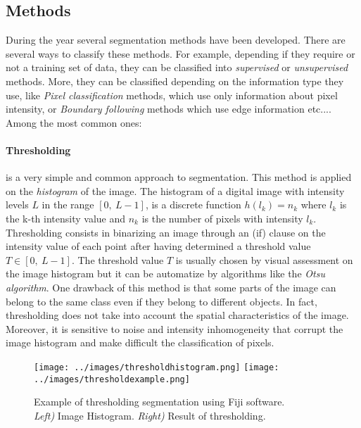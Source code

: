 \documentclass{standalone}
\begin{document}
\subsection{Methods}
During the year several segmentation methods have been developed\cite{biondi}.
There are several ways to classify these methods.
For example, depending if they require or not a training set of data, they can be classified into \textit{supervised} or \textit{unsupervised} methods.
More, they can be classified depending on the information type they use, like \textit{Pixel classification} methods, which use only information about pixel intensity, or \textit{Boundary following} methods which use edge information etc...\cite{biondi}.\\
Among the most common ones:

\paragraph{Thresholding}
is a very simple and common approach to segmentation.
This method is applied on the \textit{histogram} of the image.
The histogram of a digital image with intensity levels $L$ in the range $[0, \: L-1]$, is a discrete function $h(l_k) = n_k$ where $l_k$ is the k-th intensity value and $n_k$  is the number of pixels with intensity $l_k$.\\
Thresholding consists in binarizing an image through an (if) clause on the intensity value of each point after having determined a threshold value $T \in [0, \: L-1]$.
The threshold value $T$ is usually chosen by visual assessment on the image histogram but it can be automatize by algorithms like the \textit{Otsu algorithm}.
One drawback of this method is that some parts of the image can belong to the same class even if they belong to different objects.
In fact, thresholding does not take into account the spatial characteristics of the image.
Moreover, it is sensitive to noise and intensity inhomogeneity that corrupt the image histogram and make difficult the classification of pixels\cite{biondi}.

\begin{figure}[htp]

    \centering
    \texttt{[image: ../images/thresholdhistogram.png]}
    \texttt{[image: ../images/thresholdexample.png]}
    
    \caption{Example of thresholding segmentation using Fiji software\cite{Fiji}. \\
    \textit{ Left)} Image Histogram.\textit{ Right)} Result of thresholding.}
    \label{thresholding}
    
    \end{figure}
\end{document}
